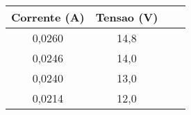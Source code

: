 % 

\begin{tabular}{|c|c|c|c|}
    \hline Corrente (A) & Tensao (V) \\ 
    \hline 0,0260 & 14,8 \\
    \hline 0,0246 & 14,0 \\
    \hline 0,0240 & 13,0 \\
    \hline 0,0214 & 12,0 \\
    \hline 
\end{tabular}
